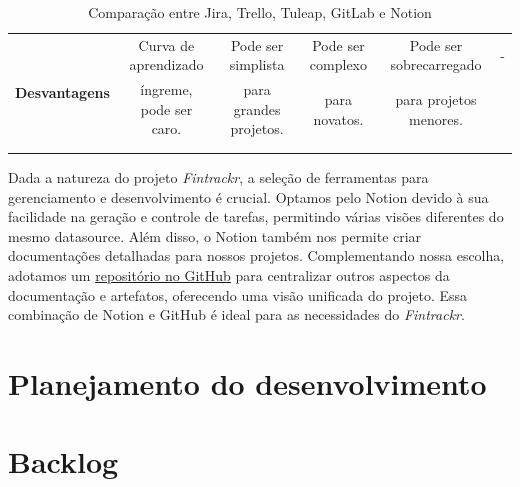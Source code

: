 \begin{table}[ht]
{\begin{tabular}{|c|c|c|c|c|c|}
			\multirow{4}{*}{\textbf{Desvantagens}} & Curva de aprendizado      & Pode ser simplista     & Pode ser complexo       & Pode ser sobrecarregado   & -                            \\
			                                       & íngreme, pode ser caro.  & para grandes projetos. & para novatos.           & para projetos menores.    &                              \\
			                                       &                           &                        &                         &                           &                              \\ 
			                                       &                           &                        &                         &                           &                              \\ \hline
		\end{tabular}%
	}
	\caption{Comparação entre Jira, Trello, Tuleap, GitLab e Notion}
	\label{tab:tool_comparison}
\end{table}          
        

Dada a natureza do projeto \textit{Fintrackr}, a seleção de ferramentas para gerenciamento e desenvolvimento é crucial. Optamos pelo Notion devido à sua facilidade na geração e controle de tarefas, permitindo várias visões diferentes do mesmo datasource. Além disso, o Notion também nos permite criar documentações detalhadas para nossos projetos. Complementando nossa escolha, adotamos um \href{https://github.com/ThiagoSchumann/fintrackr-docs}{repositório no GitHub} para centralizar outros aspectos da documentação e artefatos, oferecendo uma visão unificada do projeto. Essa combinação de Notion e GitHub é ideal para as necessidades do \textit{Fintrackr}.

\section{Planejamento do desenvolvimento}
            
\section{Backlog}

